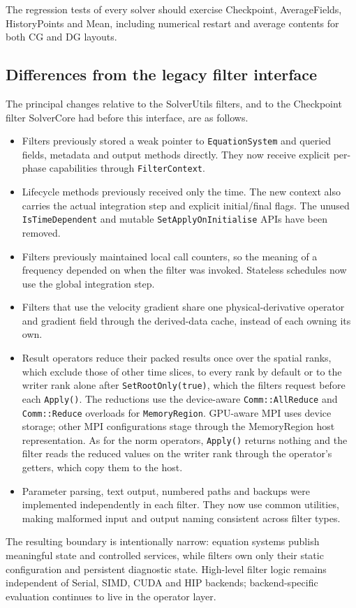 The regression tests of every solver should exercise Checkpoint,
AverageFields, HistoryPoints and Mean, including numerical restart and
average contents for both CG and DG layouts.

\subsection{Differences from the legacy filter interface}

The principal changes relative to the SolverUtils filters, and to the
Checkpoint filter SolverCore had before this interface, are as follows.

\begin{itemize}
\item Filters previously stored a weak pointer to \texttt{EquationSystem} and
      queried fields, metadata and output methods directly. They now receive
      explicit per-phase capabilities through \texttt{FilterContext}.
\item Lifecycle methods previously received only the time. The new context also
      carries the actual integration step and explicit initial/final flags.
      The unused \texttt{IsTimeDependent} and mutable
      \texttt{SetApplyOnInitialise} APIs have been removed.
\item Filters previously maintained local call counters, so the meaning of a
      frequency depended on when the filter was invoked. Stateless schedules
      now use the global integration step.
\item Filters that use the velocity gradient share one physical-derivative
      operator and gradient field through the derived-data cache, instead of
      each owning its own.
\item Result operators reduce their packed results once over the spatial
      ranks, which exclude those of other time slices, to every rank by
      default or to the writer rank alone after \texttt{SetRootOnly(true)},
      which the filters request before each \texttt{Apply()}. The reductions
      use the device-aware \texttt{Comm::AllReduce} and \texttt{Comm::Reduce}
      overloads for \texttt{MemoryRegion}. GPU-aware MPI uses device storage;
      other MPI configurations stage through the MemoryRegion host
      representation. As for the norm operators, \texttt{Apply()} returns
      nothing and the filter reads the reduced values on the writer rank
      through the operator's getters, which copy them to the host.
\item Parameter parsing, text output, numbered paths and backups were
      implemented independently in each filter. They now use common utilities,
      making malformed input and output naming consistent across filter types.
\end{itemize}

The resulting boundary is intentionally narrow: equation systems publish
meaningful state and controlled services, while filters own only their static
configuration and persistent diagnostic state. High-level filter logic remains
independent of Serial, SIMD, CUDA and HIP backends; backend-specific evaluation
continues to live in the operator layer.
